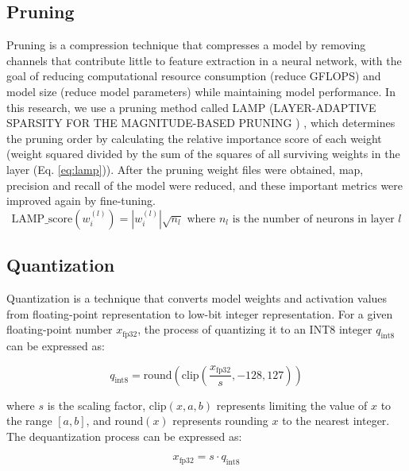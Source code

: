 \documentclass[10pt]{article}
\begin{document}
\subsection{Pruning}
Pruning is a compression technique that compresses a model by removing channels that contribute little to feature extraction in a neural network, with the goal of reducing computational resource consumption (reduce GFLOPS) and model size (reduce model parameters) while maintaining model performance. In this research, we use a pruning method called LAMP (LAYER-ADAPTIVE SPARSITY FOR THE
MAGNITUDE-BASED PRUNING
) \cite{lee2021}, which determines the pruning order by calculating the relative importance score of each weight (weight squared divided by the sum of the squares of all surviving weights in the layer (Eq. \ref{eq:lamp})). After the pruning weight files were obtained, map, precision and recall of the model were reduced, and these important metrics were improved again by fine-tuning. 
\begin{equation}
    \text{LAMP\_score}(w_i^{(l)}) = |w_i^{(l)}| \sqrt{n_l} \text{ where } n_l \text{ is the number of neurons in layer } l
    \label{eq:lamp}
\end{equation}

\subsection{Quantization}
Quantization is a technique that converts model weights and activation values from floating-point representation to low-bit integer representation. For a given floating-point number $x_{\text{fp32}}$, the process of quantizing it to an INT8 integer $q_{\text{int8}}$ can be expressed as:

   \begin{equation}
     q_{\text{int8}} = \text{round}\left(\text{clip}\left(\frac{x_{\text{fp32}}}{s}, -128, 127\right)\right)
     \label{eq:quantization}
   \end{equation}

   where $s$ is the scaling factor, $\text{clip}(x, a, b)$ represents limiting the value of $x$ to the range $[a, b]$, and $\text{round}(x)$ represents rounding $x$ to the nearest integer. The dequantization process can be expressed as:

   \begin{equation}
     x_{\text{fp32}} = s \cdot q_{\text{int8}}
     \label{eq:dequantization}
   \end{equation}
\end{document}
